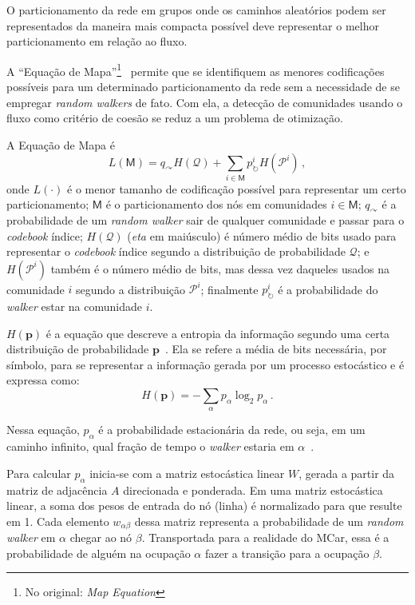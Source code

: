\documentclass[
  article,
  11pt,
  a4paper,
  english,
  brazil,
  sumario=tradicional]{abntex2}
\begin{document}
O particionamento da rede em grupos onde os caminhos aleatórios podem ser representados da maneira mais compacta possível deve representar o melhor particionamento em relação ao fluxo.

A \enquote{Equação de Mapa}\footnote{No original: \textit{Map Equation}}~\cite{Rosvall2009-sd} permite que se identifiquem as menores codificações possíveis para um determinado particionamento da rede sem a necessidade de se empregar \textit{random walkers} de fato. Com ela, a detecção de comunidades usando o fluxo como critério de coesão se reduz a um problema de otimização.

A Equação de Mapa é
\begin{equation} \label{eq:map-equation}
  L(\mathsf{M}) = q_\curvearrowright H(\mathcal{Q}) + \sum_{i \in \mathsf{M}} p^i_\circlearrowright H(\mathcal{P}^i)\,,
\end{equation}
onde $L(\cdot)$ é o menor tamanho de codificação possível para representar um certo particionamento; $\mathsf{M}$ é o particionamento dos nós em comunidades $i \in \mathsf{M}$; $q_\curvearrowright$ é a probabilidade de um \textit{random walker} sair de qualquer comunidade e passar para o \textit{codebook} índice; $H(\mathcal{Q})$ (\textit{eta} em maiúsculo) é número médio de bits usado para representar o \textit{codebook} índice segundo a distribuição de probabilidade $\mathcal{Q}$; e $H(\mathcal{P}^i)$ também é o número médio de bits, mas dessa vez daqueles usados na comunidade $i$ segundo a distribuição $\mathcal{P}^i$; finalmente $p^i_\circlearrowright$ é a probabilidade do \textit{walker} estar na comunidade $i$.

$H(\textbf{p})$ é a equação que descreve a entropia da informação segundo uma certa distribuição de probabilidade $\textbf{p}$~\cite{Shannon1948-ic}. Ela se refere a média de bits necessária, por símbolo, para se representar a informação gerada por um processo estocástico e é expressa como:
\begin{equation*}
H(\textbf{p}) = - \sum_\alpha p_\alpha \log_2 p_\alpha\,.
\end{equation*}

Nessa equação, $p_\alpha$ é a probabilidade estacionária da rede, ou seja, em um caminho infinito, qual fração de tempo o \textit{walker} estaria em $\alpha$~\cite{Rosvall2009-sd}.

Para calcular $p_\alpha$ inicia-se com a matriz estocástica linear $W$, gerada a partir da matriz de adjacência $A$ direcionada e ponderada. Em uma matriz estocástica linear, a soma dos pesos de entrada do nó (linha) é normalizado para que resulte em 1. Cada elemento $w_{\alpha \beta}$ dessa matriz representa a probabilidade de um \textit{random walker}  em $\alpha$ chegar ao nó $\beta$.  Transportada para a realidade do MCar, essa é a probabilidade de alguém na ocupação $\alpha$ fazer a transição para a ocupação $\beta$.
\end{document}
